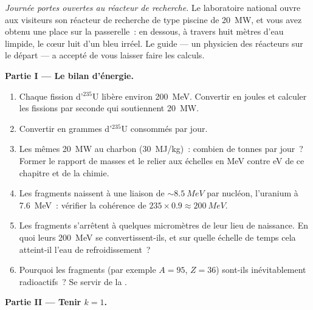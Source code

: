 \begin{problem}\label{pb:b3:nuclear-physics:1}
\emph{Journée portes ouvertes au réacteur de recherche.} Le
laboratoire national ouvre aux visiteurs son réacteur de recherche de
type piscine de \qty{20}{MW}, et vous avez obtenu une place sur la
passerelle~: en dessous, à travers huit mètres d'eau limpide, le cœur
luit d'un bleu irréel. Le guide --- un physicien des réacteurs sur le
départ --- a accepté de vous laisser faire les calculs.

\medskip\noindent\textbf{Partie I --- Le bilan d'énergie.}

\begin{enumerate}
  \item Chaque fission d'$^{235}$U libère environ \qty{200}{MeV}.
        Convertir en joules et calculer les fissions par seconde
        qui soutiennent \qty{20}{MW}.
  \item Convertir en grammes d'$^{235}$U consommés par jour.
  \item Les mêmes \qty{20}{MW} au charbon (\qty{30}{MJ/kg})~: combien
        de tonnes par jour~? Former le rapport de masses et le relier
        aux échelles en \unit{MeV} contre \unit{eV} de ce chapitre
        et de la chimie.
  \item Les fragments naissent à une liaison de
        $\sim\qty{8.5}{MeV}$ par nucléon, l'uranium à
        \qty{7.6}{MeV}~: vérifier la cohérence de
        $235\times0.9 \approx \qty{200}{MeV}$.
  \item Les fragments s'arrêtent à quelques micromètres de leur lieu
        de naissance. En quoi leurs \qty{200}{MeV} se
        convertissent-ils, et sur quelle échelle de temps cela
        atteint-il l'eau de refroidissement~?
  \item Pourquoi les fragments (par exemple $A = 95$, $Z = 36$)
        sont-ils inévitablement radioactifs~? Se servir de la
        .
\end{enumerate}

\medskip\noindent\textbf{Partie II --- Tenir $k = 1$.}


\end{problem}
